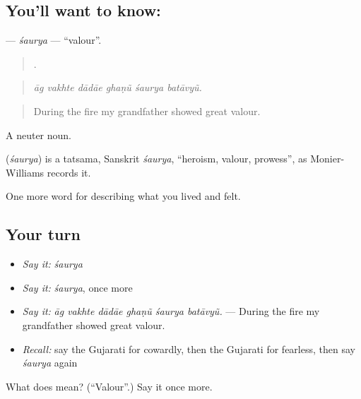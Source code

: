 \subsection*{You'll want to know: }
\textbf{} — \emph{śaurya} — \textquotedblleft{}valour\textquotedblright{}.

\begin{quote}
     .
\end{quote}

\begin{quote}
\emph{āg vakhte dādāe ghaṇũ śaurya batāvyũ.}
\end{quote}

\begin{quote}
During the fire my grandfather showed great valour.
\end{quote}

A neuter noun.

\begin{cousinweb}
\textbf{} (\emph{śaurya}) is a tatsama, Sanskrit \emph{śaurya}, \textquotedblleft{}heroism, valour, prowess\textquotedblright{}, as Monier-Williams records it.
\end{cousinweb}

\begin{grammarlens}[title={What you've built}]
One more word for describing what you lived and felt.
\end{grammarlens}

\subsection*{Your turn}
\begin{itemize}
\raggedright
  \item \emph{Say it:} \emph{śaurya}
  \item \emph{Say it:} \emph{śaurya}, once more
  \item \emph{Say it:} \emph{āg vakhte dādāe ghaṇũ śaurya batāvyũ.} — During the fire my grandfather showed great valour.
  \item \emph{Recall:} say the Gujarati for cowardly, then the Gujarati for fearless, then say \emph{śaurya} again
\end{itemize}

\begin{tcolorbox}[breakable,colback=teal!4,colframe=teal!35!black,title={Before you move on}]
What does  mean? (\textquotedblleft{}Valour\textquotedblright{}.) Say it once more.
\end{tcolorbox}
